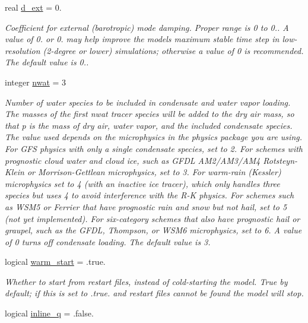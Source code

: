 \begin{DoxyCompactItemize}
real \hyperlink{structfv__arrays__mod_1_1fv__flags__type_a95caa816eb573eaf9bd1a8b388e87e30}{d\-\_\-ext} = 0.
\begin{DoxyCompactList}\small\item\em Coefficient for external (barotropic) mode damping. Proper range is 0 to 0.. A value of 0. or 0. may help improve the models maximum stable time step in low-\/resolution (2-\/degree or lower) simulations; otherwise a value of 0 is recommended. The default value is 0.. \end{DoxyCompactList}\item 
integer \hyperlink{structfv__arrays__mod_1_1fv__flags__type_a42c93d1b25fbe7725462deeaa69f89a6}{nwat} = 3
\begin{DoxyCompactList}\small\item\em Number of water species to be included in condensate and water vapor loading. The masses of the first nwat tracer species will be added to the dry air mass, so that p is the mass of dry air, water vapor, and the included condensate species. The value used depends on the microphysics in the physics package you are using. For G\-F\-S physics with only a single condensate species, set to 2. For schemes with prognostic cloud water and cloud ice, such as G\-F\-D\-L A\-M2/\-A\-M3/\-A\-M4 Rotsteyn-\/\-Klein or Morrison-\/\-Gettlean microphysics, set to 3. For warm-\/rain (Kessler) microphysics set to 4 (with an inactive ice tracer), which only handles three species but uses 4 to avoid interference with the R-\/\-K physics. For schemes such as W\-S\-M5 or Ferrier that have prognostic rain and snow but not hail, set to 5 (not yet implemented). For six-\/category schemes that also have prognostic hail or graupel, such as the G\-F\-D\-L, Thompson, or W\-S\-M6 microphysics, set to 6. A value of 0 turns off condensate loading. The default value is 3. \end{DoxyCompactList}\item 
logical \hyperlink{structfv__arrays__mod_1_1fv__flags__type_a213ea7debdf2b2feb97c44dd606818a5}{warm\-\_\-start} = .true.
\begin{DoxyCompactList}\small\item\em Whether to start from restart files, instead of cold-\/starting the model. True by default; if this is set to .true. and restart files cannot be found the model will stop. \end{DoxyCompactList}\item 
logical \hyperlink{structfv__arrays__mod_1_1fv__flags__type_a7630553d7bb9549c7092f49184a409cd}{inline\-\_\-q} = .false.

\end{DoxyCompactItemize}
